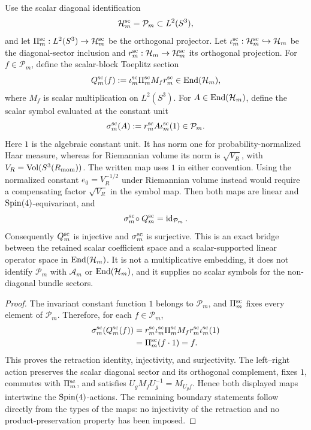 \documentclass[12pt,a4paper]{article}
\begin{document}
\begin{proposition}
\label{p2:prop:scalar-toeplitz-symbol-retraction}
Use the scalar diagonal identification
\[
 \mathcal H_m^{\rm sc}=\mathcal P_m
 \subset L^2(S^3),
\]
and let \(\Pi_m^{\rm sc}:L^2(S^3)\to\mathcal H_m^{\rm sc}\) be
the orthogonal projector.  Let
\(\iota_m^{\rm sc}:\mathcal H_m^{\rm sc}\hookrightarrow\mathcal H_m\)
be the diagonal-sector inclusion and
\(r_m^{\rm sc}:\mathcal H_m\to\mathcal H_m^{\rm sc}\) its orthogonal
projection.  For \(f\in\mathcal P_m\), define the scalar-block Toeplitz
section
\[
 Q_m^{\rm sc}(f)
 :=
 \iota_m^{\rm sc}\Pi_m^{\rm sc}M_f r_m^{\rm sc}
 \in\operatorname{End}(\mathcal H_m),
\]
where \(M_f\) is scalar multiplication on \(L^2(S^3)\).  For
\(A\in\operatorname{End}(\mathcal H_m)\), define the scalar symbol evaluated at the
constant unit
\[
 \sigma_m^{\rm sc}(A)
 :=
 r_m^{\rm sc}A\iota_m^{\rm sc}(1)
 \in\mathcal P_m.
\]
Here \(1\) is the algebraic constant unit.  It has norm one for
probability-normalized Haar measure, whereas for Riemannian volume its norm
is \(\sqrt{V_R}\), with
\(V_R=\operatorname{Vol}(S^3(R_{\mathrm{mom}}))\).  The written map uses \(1\) in
either convention.  Using the normalized constant \(e_0=V_R^{-1/2}\)
under Riemannian volume instead would require a compensating factor
\(\sqrt{V_R}\) in the symbol map.
Then both maps are linear and \(\mathrm{Spin}(4)\)-equivariant, and
\[
 \sigma_m^{\rm sc}\!\circ Q_m^{\rm sc}
 =
 \operatorname{id}_{\mathcal P_m}.
\]
Consequently \(Q_m^{\rm sc}\) is injective and
\(\sigma_m^{\rm sc}\) is surjective.  This is an exact bridge between the
retained scalar coefficient space and a scalar-supported linear operator
space in
\(\operatorname{End}(\mathcal H_m)\).  It is not a multiplicative embedding, it does not
identify \(\mathcal P_m\) with \(\mathcal A_m\) or
\(\operatorname{End}(\mathcal H_m)\), and it supplies no scalar symbols for the
non-diagonal bundle sectors.
\end{proposition}

\begin{proof}
The invariant constant function \(1\) belongs to \(\mathcal P_m\), and
\(\Pi_m^{\rm sc}\) fixes every element of \(\mathcal P_m\).  Therefore, for
each \(f\in\mathcal P_m\),
\[
\begin{aligned}
 \sigma_m^{\rm sc}\!\left(Q_m^{\rm sc}(f)\right)
 &=
 r_m^{\rm sc}\iota_m^{\rm sc}
 \Pi_m^{\rm sc}M_f
 r_m^{\rm sc}\iota_m^{\rm sc}(1)\\
 &=
 \Pi_m^{\rm sc}(f\cdot1)
 =f.
\end{aligned}
\]
This proves the retraction identity, injectivity, and surjectivity.  The
left--right action preserves the scalar diagonal sector and its orthogonal
complement, fixes \(1\), commutes with \(\Pi_m^{\rm sc}\), and satisfies
\(U_gM_fU_g^{-1}=M_{U_gf}\).  Hence both displayed maps intertwine the
\(\mathrm{Spin}(4)\)-actions.  The remaining boundary statements follow directly
from the types of the maps: no injectivity of the retraction and no
product-preservation property has been imposed.
\end{proof}
\end{document}
